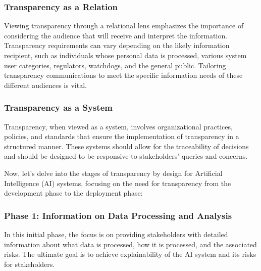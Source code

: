 \documentclass{article}
\begin{document}
\subsubsection{Transparency as a Relation}

Viewing transparency through a relational lens emphasizes the importance of considering the audience that will receive and interpret the information. Transparency requirements can vary depending on the likely information recipient, such as individuals whose personal data is processed, various system user categories, regulators, watchdogs, and the general public. Tailoring transparency communications to meet the specific information needs of these different audiences is vital.

\subsubsection{Transparency as a System}

Transparency, when viewed as a system, involves organizational practices, policies, and standards that ensure the implementation of transparency in a structured manner. These systems should allow for the traceability of decisions and should be designed to be responsive to stakeholders' queries and concerns.

Now, let's delve into the stages of transparency by design for Artificial Intelligence (AI) systems, focusing on the need for transparency from the development phase to the deployment phase:

\subsubsection{Phase 1: Information on Data Processing and Analysis}

In this initial phase, the focus is on providing stakeholders with detailed information about what data is processed, how it is processed, and the associated risks. The ultimate goal is to achieve explainability of the AI system and its risks for stakeholders.
\end{document}
